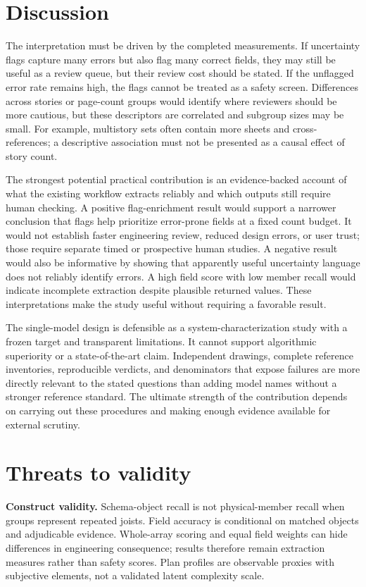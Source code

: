\documentclass[11pt]{article}
\begin{document}
\section{Discussion}
The interpretation must be driven by the completed measurements. If uncertainty flags capture many errors but also flag many correct fields, they may still be useful as a review queue, but their review cost should be stated. If the unflagged error rate remains high, the flags cannot be treated as a safety screen. Differences across stories or page-count groups would identify where reviewers should be more cautious, but these descriptors are correlated and subgroup sizes may be small. For example, multistory sets often contain more sheets and cross-references; a descriptive association must not be presented as a causal effect of story count.

The strongest potential practical contribution is an evidence-backed account of what the existing workflow extracts reliably and which outputs still require human checking. A positive flag-enrichment result would support a narrower conclusion that flags help prioritize error-prone fields at a fixed count budget. It would not establish faster engineering review, reduced design errors, or user trust; those require separate timed or prospective human studies. A negative result would also be informative by showing that apparently useful uncertainty language does not reliably identify errors. A high field score with low member recall would indicate incomplete extraction despite plausible returned values. These interpretations make the study useful without requiring a favorable result.

The single-model design is defensible as a system-characterization study with a frozen target and transparent limitations. It cannot support algorithmic superiority or a state-of-the-art claim. Independent drawings, complete reference inventories, reproducible verdicts, and denominators that expose failures are more directly relevant to the stated questions than adding model names without a stronger reference standard. The ultimate strength of the contribution depends on carrying out these procedures and making enough evidence available for external scrutiny.

\section{Threats to validity}
\textbf{Construct validity.} Schema-object recall is not physical-member recall when groups represent repeated joists. Field accuracy is conditional on matched objects and adjudicable evidence. Whole-array scoring and equal field weights can hide differences in engineering consequence; results therefore remain extraction measures rather than safety scores. Plan profiles are observable proxies with subjective elements, not a validated latent complexity scale.
\end{document}
